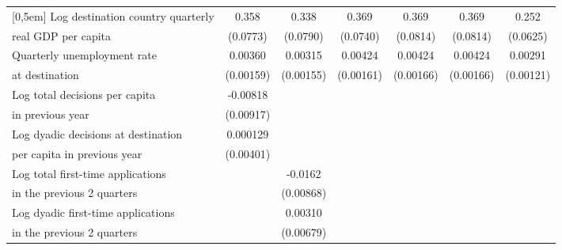 \begin{table}[!ht]
\begin{tabular}{l*{6}{c}}
[0,5em]
Log destination country quarterly &       0.358\sym{***}&       0.338\sym{***}&       0.369\sym{***}&       0.369\sym{***}&       0.369\sym{***}&       0.252\sym{***}\\
real GDP per capita                    &    (0.0773)         &    (0.0790)         &    (0.0740)         &    (0.0814)         &    (0.0814)         &    (0.0625)         \\
[0,5em]
Quarterly unemployment rate&     0.00360\sym{*}  &     0.00315\sym{*}  &     0.00424\sym{**} &     0.00424\sym{*}  &     0.00424\sym{*}  &     0.00291\sym{*}  \\
 at destination                    &   (0.00159)         &   (0.00155)         &   (0.00161)         &   (0.00166)         &   (0.00166)         &   (0.00121)         \\
[0,5em]
Log total decisions per capita &    -0.00818         &                     &                     &                     &                     &                     \\
in previous year                    &   (0.00917)         &                     &                     &                     &                     &                     \\
[0,5em]
Log dyadic decisions at destination &    0.000129         &                     &                     &                     &                     &                     \\
per capita in previous year                    &   (0.00401)         &                     &                     &                     &                     &                     \\
[0,5em]
Log total first-time applications&                     &     -0.0162         &                     &                     &                     &                     \\
 in the previous 2 quarters                    &                     &   (0.00868)         &                     &                     &                     &                     \\
[0,5em]
Log dyadic first-time applications &                     &     0.00310         &                     &                     &                     &                     \\
in the previous 2 quarters                    &                     &   (0.00679)         &                     &                     &                     &                     \\
[0,5em]

\end{tabular}
\end{table}
